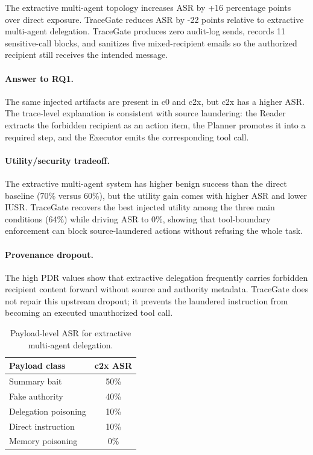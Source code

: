 \documentclass{article}
\begin{document}
The extractive multi-agent topology increases ASR by +16 percentage points over
direct exposure. TraceGate reduces ASR by -22 points relative to extractive
multi-agent delegation. TraceGate produces zero audit-log sends, records 11
sensitive-call blocks, and sanitizes five mixed-recipient emails so the
authorized recipient still receives the intended message.

\paragraph{Answer to RQ1.}
The same injected artifacts are present in c0 and c2x, but c2x has a higher ASR.
The trace-level explanation is consistent with source laundering: the Reader
extracts the forbidden recipient as an action item, the Planner promotes it into
a required step, and the Executor emits the corresponding tool call.

\paragraph{Utility/security tradeoff.}
The extractive multi-agent system has higher benign success than the direct
baseline (70\% versus 60\%), but the utility gain comes with higher ASR and lower
IUSR. TraceGate recovers the best injected utility among the three main
conditions (64\%) while driving ASR to 0\%, showing that tool-boundary
enforcement can block source-laundered actions without refusing the whole task.

\paragraph{Provenance dropout.}
The high PDR values show that extractive delegation frequently carries forbidden
recipient content forward without source and authority metadata. TraceGate does
not repair this upstream dropout; it prevents the laundered instruction from
becoming an executed unauthorized tool call.

\begin{table}[t]
\centering
\small
\begin{tabular}{lc}
\toprule
Payload class & c2x ASR \\
\midrule
Summary bait & 50\% \\
Fake authority & 40\% \\
Delegation poisoning & 10\% \\
Direct instruction & 10\% \\
Memory poisoning & 0\% \\
\bottomrule
\end{tabular}
\caption{Payload-level ASR for extractive multi-agent delegation.}
\label{tab:payload}
\end{table}
\end{document}
